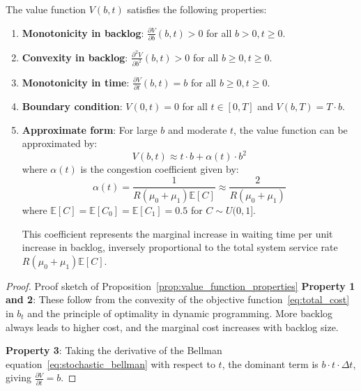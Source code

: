 \documentclass[opre,sglanonrev]{informs4}
\begin{document}
{\color{brown}
\begin{proposition}
\label{prop:value_function_properties}
The value function \( V(b, t) \) satisfies the following properties:
\begin{enumerate}
    \item \textbf{Monotonicity in backlog}: \( \frac{\partial V}{\partial b}(b, t) > 0 \) for all \( b > 0, t \geq 0 \).
    
    \item \textbf{Convexity in backlog}: \( \frac{\partial^2 V}{\partial b^2}(b, t) > 0 \) for all \( b \geq 0, t \geq 0 \).
    
    \item \textbf{Monotonicity in time}: \( \frac{\partial V}{\partial t}(b, t) = b \) for all \( b \geq 0, t \geq 0 \).
    
    \item \textbf{Boundary condition}: \( V(0, t) = 0 \) for all \( t \in [0, T] \) and \( V(b, T) = T \cdot b \).
    
    \item \textbf{Approximate form}: For large \( b \) and moderate \( t \), the value function can be approximated by:
    \[
    V(b, t) \approx t \cdot b + \alpha(t) \cdot b^2
    \]
    where \( \alpha(t) \) is the congestion coefficient given by:
    \[
    \alpha(t) = \frac{1}{R(\mu_0 + \mu_1) \mathbb{E}[C]} \approx \frac{2}{R(\mu_0 + \mu_1)}
    \]
    where \( \mathbb{E}[C] = \mathbb{E}[C_0] = \mathbb{E}[C_1] = 0.5 \) for \( C \sim U(0,1] \).
    
    This coefficient represents the marginal increase in waiting time per unit increase in backlog, inversely proportional to the total system service rate \( R(\mu_0 + \mu_1) \mathbb{E}[C] \).
\end{enumerate}
\end{proposition}

\begin{proof}{Proof sketch of Proposition~\ref{prop:value_function_properties}}
\textbf{Property 1 and 2}: These follow from the convexity of the objective function~\eqref{eq:total_cost} in \( b_t \) and the principle of optimality in dynamic programming. More backlog always leads to higher cost, and the marginal cost increases with backlog size.

\textbf{Property 3}: Taking the derivative of the Bellman equation~\eqref{eq:stochastic_bellman} with respect to \( t \), the dominant term is \( b \cdot t \cdot \Delta t \), giving \( \frac{\partial V}{\partial t} = b \).


\end{proof}}
\end{document}
